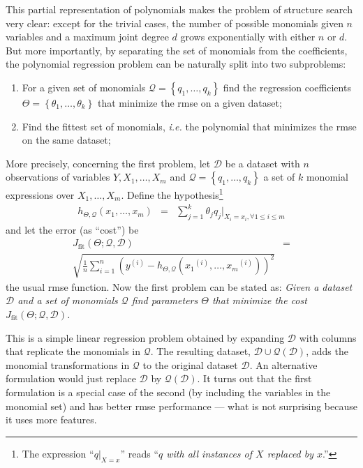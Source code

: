 \documentclass[preprint,authoryear,12pt]{elsarticle}
\newcommand{\sample}[1]{\ensuremath{^{\left(#1\right)}}}
\begin{document}
This partial representation of polynomials makes the problem of structure search very clear: except for the trivial cases, the number of possible monomials given $n$ variables and a maximum joint degree $d$ grows exponentially with either $n$ or $d$. But more importantly, by separating the set of monomials from the coefficients, the polynomial regression problem can be naturally split into two subproblems:
%
\begin{enumerate}
\item For a given set of monomials $\mathcal{Q} = \left\lbrace q_1, \ldots, q_k\right\rbrace$ find the regression coefficients $\Theta = \left\lbrace \theta_1,\ldots,\theta_k \right\rbrace$ that minimize the \ac{rmse} on a given dataset;

\item Find the fittest set of monomials, \emph{i.e.} the polynomial that minimizes the \ac{rmse} on the same dataset;
\end{enumerate}
%
More precisely, concerning the first problem, let $\mathcal{D}$ be a dataset with $n$ observations of variables $Y, X_1,\ldots,X_m$ and $\mathcal{Q} = \left\lbrace q_1,\ldots, q_k\right\rbrace$ a set of $k$ monomial expressions over $X_1,\ldots,X_m$. Define the hypothesis\footnote{The expression ``$q|_{X=x}$'' reads ``\emph{$q$ with all instances of $X$ replaced by $x$}.''}
%
\begin{eqnarray*}
h_{\Theta,\mathcal{Q}}\left(x_1,\ldots,x_m\right) &=& \sum_{j = 1}^k \theta_j q_j|_{X_i=x_i,\forall 1 \leq i \leq m}
\end{eqnarray*}
%
and let the error (as ``cost'') be
%
\begin{eqnarray}
J_{\textrm{fit}}\left(\Theta;\mathcal{Q},\mathcal{D}\right)  & =  \nonumber \\
\sqrt{\frac{1}{n}\sum_{i=1}^n \left( y\sample{i} - h_{\Theta,\mathcal{Q}}\left( x_1\sample{i},\ldots,x_m\sample{i} \right) \right)^2 }\label{eq:rmse}
\end{eqnarray}
%
the usual \acf{rmse} function. Now the first problem can be stated as:
%
\emph{Given a dataset $\mathcal{D}$ and a set of monomials $\mathcal{Q}$ find parameters $\Theta$ that minimize the cost $J_{\textrm{fit}}\left(\Theta;\mathcal{Q},\mathcal{D}\right)$.}

%
This is a simple linear regression problem obtained by expanding $\mathcal{D}$ with columns that replicate the monomials in $\mathcal{Q}$. The resulting dataset, $\mathcal{D} \cup \mathcal{Q}\left( \mathcal{D} \right)$, adds the monomial transformations in $\mathcal{Q}$ to the original dataset $\mathcal{D}$. An alternative formulation would just replace $\mathcal{D}$ by $\mathcal{Q}\left( \mathcal{D} \right)$. It turns out that the first formulation is a special case of the second (by including the variables in the monomial set) and has better \ac{rmse} performance --- what is not surprising because it uses more features.
\end{document}
